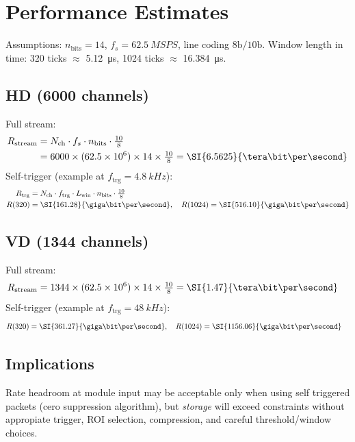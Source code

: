 
\section{Performance Estimates}






Assumptions: $n_\text{bits}=14$, $f_s=\SI{62.5}{MSPS}$, line coding $8\mathrm{b}/10\mathrm{b}$.
Window length in time: 320 ticks $\approx$ \SI{5.12}{\micro\second}, 1024 ticks $\approx$ \SI{16.384}{\micro\second}.

\subsection{HD (6000 channels)}
Full stream:
\begin{align}
R_\text{stream} &= N_\text{ch}\cdot f_s \cdot n_\text{bits} \cdot \tfrac{10}{8} \\
&= 6000 \times (62.5\times 10^6)\times 14 \times \tfrac{10}{8} = \SI{6.5625}{\tera\bit\per\second}
\end{align}
Self-trigger (example at $f_\text{trg}=\SI{4.8}{kHz}$):
\begin{align}
R_\text{trg} &= N_\text{ch}\cdot f_\text{trg}\cdot L_\text{win}\cdot n_\text{bits}\cdot \tfrac{10}{8} \\
R(320) &= \SI{161.28}{\giga\bit\per\second},\quad R(1024)=\SI{516.10}{\giga\bit\per\second}
\end{align}

\subsection{VD (1344 channels)}
Full stream:
\begin{align}
R_\text{stream} &= 1344 \times (62.5\times 10^6)\times 14 \times \tfrac{10}{8} = \SI{1.47}{\tera\bit\per\second}
\end{align}
Self-trigger (example at $f_\text{trg}=\SI{48}{kHz}$):
\begin{align}
R(320) &= \SI{361.27}{\giga\bit\per\second},\quad R(1024)=\SI{1156.06}{\giga\bit\per\second}
\end{align}

\subsection{Implications}
Rate headroom at module input may be acceptable only when using self triggered packets (cero suppression algorithm), but \emph{storage} will exceed constraints without appropiate trigger, ROI selection, compression, and careful threshold/window choices.
